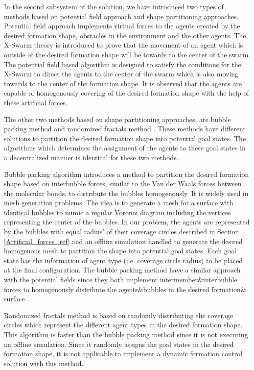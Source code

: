 In the second subsystem of the solution, we have introduced two types of methods based on potential field approach and shape partitioning approaches. Potential field approach implements virtual forces to the agents created by the desired formation shape, obstacles in the environment and the other agents. The X-Swarm theory is introduced to prove that the movement of an agent which is outside of the desired formation shape will be towards to the center of the swarm. The potential field based algorithm is designed to satisfy the conditions for the X-Swarm to direct the agents to the center of the swarm which is also moving towards to the center of the formation shape. It is observed that the agents are capable of homogenously covering of the desired formation shape with the help of these artificial forces.

The other two methods based on shape partitioning approaches, are bubble packing method and randomized fractals method . These methods have different solutions to partition the desired formation shape into potential goal states. The algorithms which determines the assignment of the agents to these goal states in a decentralized manner is identical for these two methods. 

Bubble packing algorithm introduces a method to partition the desired formation shape based on interbubble forces, similar to the Van der Waals forces between the molecular bonds, to distribute the bubbles homogenously. It is widely used in mesh generation problems. The idea is to generate a mesh for a surface with identical bubbles to mimic a regular Voronoi diagram including the vertices representing the center of the bubbles. In our problem, the agents are represented by the  bubbles with equal radius' of their coverage circles described in Section \ref{Artificial_forces_ref} and an offline simulation handled to generate the desired homogenous mesh to partition the shape into potential goal states. Each goal state has the information of agent type (i.e. coverage circle radius) to be placed at the final configuration. The bubble packing method have a similar approach with the potential fields since they both implement intermember$\&$interbubble forces to homogenously distribute the agents$\&$bubbles in the desired formation$\&$surface 
       
Randomized fractals method is based on randomly distributing the coverage circles which represent the different agent types in the desired formation shape. This algorithm is faster than the bubble packing method since it is not executing an offline simulation. Since it randomly assigns the goal states in the desired formation shape, it is not applicable to implement a dynamic formation control solution with this method. 
       
